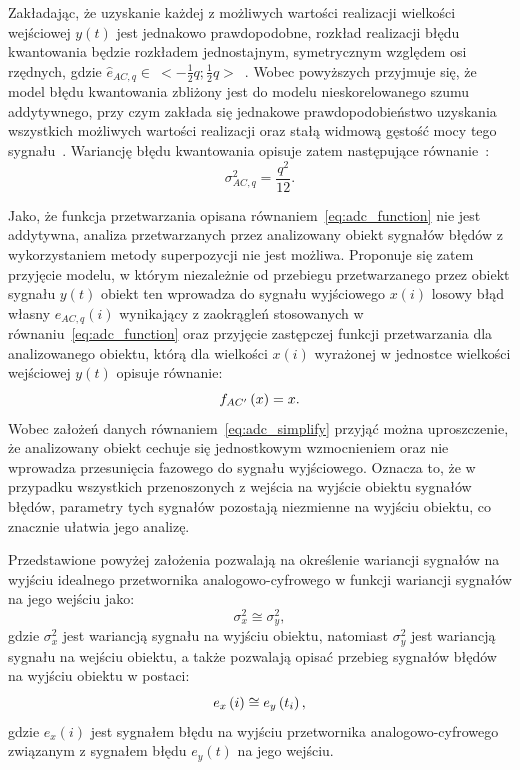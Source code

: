 Zakładając, że uzyskanie każdej z możliwych wartości realizacji wielkości wejściowej $y(t)$ jest jednakowo prawdopodobne, rozkład realizacji błędu kwantowania będzie rozkładem jednostajnym, symetrycznym względem osi rzędnych, gdzie $\hat{e}_{AC,q} \in~<-\frac{1}{2} q;\frac{1}{2} q>$~\cite{jakubiec_przetwarzanie, jakubiec_system, sienkowski_kwant}. Wobec powyższych przyjmuje się, że model błędu kwantowania zbliżony jest do modelu nieskorelowanego szumu addytywnego, przy czym zakłada się jednakowe prawdopodobieństwo uzyskania wszystkich możliwych wartości realizacji oraz stałą widmową gęstość mocy tego sygnału~\cite{gray_quantization, widrow_quantization}. Wariancję błędu kwantowania opisuje zatem następujące równanie~\cite{jcgm_guide}:
\begin{equation}
\sigma_{AC,q}^{2} = \frac{q^{2}}{12} \label{eq:adc_errvar}.
\end{equation}

Jako, że funkcja przetwarzania opisana równaniem~\eqref{eq:adc_function} nie jest addytywna, analiza przetwarzanych przez analizowany obiekt sygnałów błędów z wykorzystaniem metody superpozycji nie jest możliwa. Proponuje się zatem przyjęcie modelu, w którym niezależnie od przebiegu przetwarzanego przez obiekt sygnału $y(t)$ obiekt ten wprowadza do sygnału wyjściowego $x(i)$ losowy błąd własny $e_{AC,q}(i)$ wynikający z zaokrągleń stosowanych w równaniu~\eqref{eq:adc_function} oraz przyjęcie zastępczej funkcji przetwarzania dla analizowanego obiektu, którą dla wielkości $x(i)$ wyrażonej w jednostce wielkości wejściowej $y(t)$ opisuje równanie:
\begin{equation}
f_{AC'} \left(x\right) = x \label{eq:adc_simplify}.
\end{equation}
Wobec założeń danych równaniem~\eqref{eq:adc_simplify} przyjąć można uproszczenie, że analizowany obiekt cechuje się jednostkowym wzmocnieniem oraz nie wprowadza przesunięcia fazowego do sygnału wyjściowego. Oznacza to, że w przypadku wszystkich przenoszonych z wejścia na wyjście obiektu sygnałów błędów, parametry tych sygnałów pozostają niezmienne na wyjściu obiektu, co znacznie ułatwia jego analizę.

Przedstawione powyżej założenia pozwalają na określenie wariancji sygnałów na wyjściu idealnego przetwornika analogowo-cyfrowego w funkcji wariancji sygnałów na jego wejściu jako:
\begin{equation}
\sigma_{x}^{2} \cong \sigma_{y}^{2} \label{eq:adc_varout},
\end{equation}
gdzie $\sigma_{x}^{2}$ jest wariancją sygnału na wyjściu obiektu, natomiast $\sigma_{y}^{2}$ jest wariancją sygnału na wejściu obiektu, a także pozwalają opisać przebieg sygnałów błędów na wyjściu obiektu w postaci:
\begin{equation}
e_{x} \left(i\right) \cong e_{y} \left(t_{i}\right) \label{eq:adc_errout},
\end{equation}
gdzie $e_{x}(i)$ jest sygnałem błędu na wyjściu przetwornika analogowo-cyfrowego związanym z sygnałem błędu $e_{y}(t)$ na jego wejściu.

